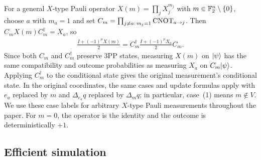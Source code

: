 For a general $X$-type Pauli operator $X(m)=\prod_j X_j^{m_j}$ with $m\in\mathbb{F}_2^n\setminus\{0\}$, choose $a$ with $m_a=1$ and set $C_m=\prod_{j\ne a:\,m_j=1}\operatorname{CNOT}_{a\to j}$. Then $C_mX(m)C_m^\dagger=X_a$, so
\begin{align}
    \frac{I+(-1)^\mu X(m)}{2}
    =C_m^\dagger\frac{I+(-1)^\mu X_a}{2}C_m.
    \label{eq:x-measurement-reduction}
\end{align}
Since both $C_m$ and $C_m^\dagger$ preserve 3PP states, measuring $X(m)$ on $|\psi\rangle$ has the same compatibility and outcome probabilities as measuring $X_a$ on $C_m|\psi\rangle$. Applying $C_m^\dagger$ to the conditional state gives the original measurement's conditional state. In the original coordinates, the same cases and update formulas apply with $e_a$ replaced by $m$ and $\Delta_{e_a}q$ replaced by $\Delta_mq$; in particular, case~(1) means $m\notin V$. We use these case labels for arbitrary $X$-type Pauli measurements throughout the paper. For $m=0$, the operator is the identity and the outcome is deterministically $+1$.

\subsection{Efficient simulation}


